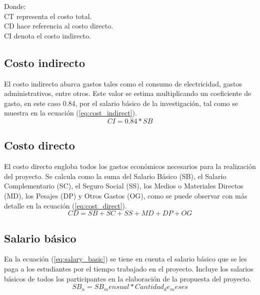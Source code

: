 Donde: \\
CT representa el costo total. \\
CD hace referencia al costo directo. \\
CI denota el costo indirecto.

\subsection{Costo indirecto}

El costo indirecto abarca gastos tales como el consumo de electricidad, gastos administrativos, entre otros. Este valor se estima multiplicando un coeficiente de gasto, en este caso 0.84, por el salario básico de la investigación, tal como se muestra en la ecuación (\ref{eq:cost_indirect}). \\

\begin{equation} 
\label{eq:cost_indirect}
CI = 0.84 * SB 
\end{equation}

\subsection{Costo directo}

El costo directo engloba todos los gastos económicos necesarios para la realización del proyecto. Se calcula como la suma del Salario Básico (SB), el Salario Complementario (SC), el Seguro Social (SS), los Medios o Materiales Directos (MD), los Pesajes (DP) y Otros Gastos (OG), como se puede observar con más detalle en la ecuación (\ref{eq:cost_direct}). \\

\begin{equation} 
\label{eq:cost_direct}
CD = SB + SC + SS + MD + DP + OG 
\end{equation}

\subsection{Salario básico}

En la ecuación (\ref{eq:salary_basic}) se tiene en cuenta el salario básico que se les paga a los estudiantes por el tiempo trabajado en el proyecto. Incluye los salarios básicos de todos los participantes en la elaboración de la propuesta del proyecto. \\

\begin{equation} 
\label{eq:salary_basic}
SB_n = SB_mensual * Cantidad_de_meses 
\end{equation}

